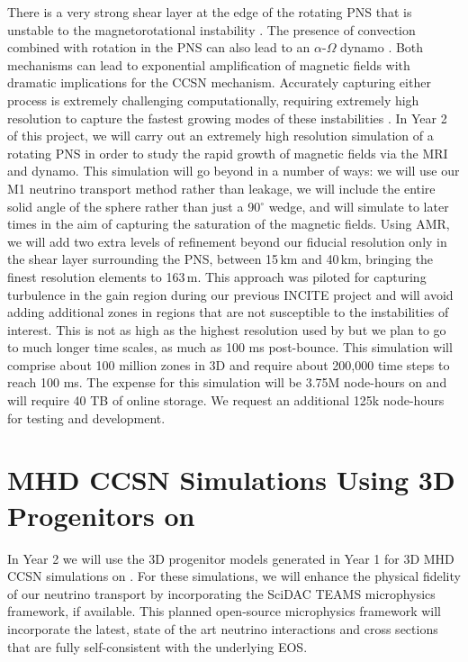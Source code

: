 \documentclass[12pt]{article}
\begin{document}
There is a very strong shear layer at the edge of the rotating PNS that is unstable to the magnetorotational instability \citep[MRI,][]{Akiyama:2003, Burrows:2007}.
The presence of convection combined with rotation in the PNS can also lead to an $\alpha$-$\Omega$ dynamo \citep{Mosta:2015}.
Both mechanisms can lead to exponential amplification of magnetic fields with dramatic implications for the CCSN mechanism.
Accurately capturing either process is extremely challenging computationally, requiring extremely high resolution to capture the fastest growing modes of these instabilities \citep{Mosta:2015}.
In Year 2 of this project, we will carry out an extremely high resolution simulation of a rotating PNS in order to study the rapid growth of magnetic fields via the MRI and dynamo.
This simulation will go beyond \citet{Mosta:2015} in a number of ways: we will use our M1 neutrino transport method rather than leakage, we will include the entire solid angle of the sphere rather than just a 90$^\circ$ wedge, and will simulate to later times in the aim of capturing the saturation of the magnetic fields.
Using AMR, we will add two extra levels of refinement beyond our fiducial resolution only in the shear layer surrounding the PNS, between 15\,km and 40\,km, bringing the finest resolution elements to 163\,m.
This approach was piloted for capturing turbulence in the gain region during our previous INCITE project and will avoid adding additional zones in regions that are not susceptible to the instabilities of interest.
This is not as high as the highest resolution used by \citet{Mosta:2015} but we plan to go to much longer time scales, as much as 100 ms post-bounce.
This simulation will comprise about 100 million zones in 3D and require about 200,000 time steps to reach 100 ms.
The expense for this simulation will be 3.75M node-hours on \mira and will require 40 TB of online storage. We request an additional 125k node-hours for testing and development.

\section{MHD CCSN Simulations Using 3D Progenitors on \thet}
\label{sec:Y2thet}

In Year 2 we will use the 3D progenitor models generated in Year 1 for 3D MHD CCSN simulations on \thet.
For these simulations, we will enhance the physical fidelity of our neutrino transport by incorporating the SciDAC TEAMS microphysics framework, if available.
This planned open-source microphysics framework will incorporate the latest, state of the art neutrino interactions and cross sections that are fully self-consistent with the underlying EOS.
\end{document}
